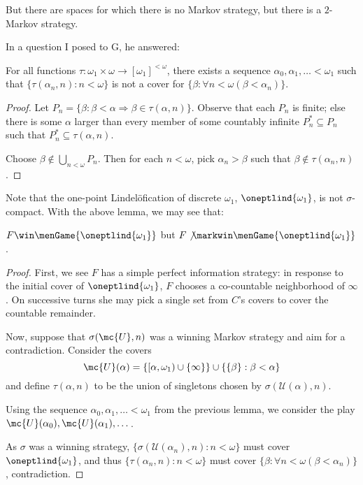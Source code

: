   But there are spaces for which there is no Markov strategy, but there is a $2$-Markov strategy.

  In a question I posed to G, he answered:

  \begin{lem}
    For all functions $\tau:\omega_1\times\omega \rightarrow [\omega_1]^{<\omega}$, there exists a sequence $\alpha_0, \alpha_1, \dots < \omega_1$ such that $\{\tau(\alpha_n,n): n<\omega\}$ is not a cover for $\{\beta:\forall n<\omega (\beta < \alpha_n)\}$.
  \end{lem}

  \begin{proof}
    Let $P_n = \{\beta: \beta < \alpha \Rightarrow \beta \in \tau(\alpha, n)\}$. Observe that each $P_n$ is finite; else there is some $\alpha$ larger than every member of some countably infinite $P_n^*\subseteq P_n$ such that $P_n^* \subseteq \tau(\alpha, n)$.

    Choose $\beta \not\in \bigcup_{n<\omega} P_n$. Then for each $n<\omega$, pick $\alpha_n>\beta$ such that $\beta \not\in \tau(\alpha_n, n)$.
  \end{proof}

  Note that the one-point Lindel\"ofication of discrete $\omega_1$, $\oneptlind{\omega_1}$, is not $\sigma$-compact. With the above lemma, we may see that:

  \begin{ex}
    $F \win \menGame{\oneptlind{\omega_1}}$ but $F \not\markwin \menGame{\oneptlind{\omega_1}}$.
  \end{ex}

  \begin{proof}
    First, we see $F$ has a simple perfect information strategy: in response to the initial cover of $\oneptlind{\omega_1}$, $F$ chooses a co-countable neighborhood of $\infty$. On successive turns she may pick a single set from $C$'s covers to cover the countable remainder.

    Now, suppose that $\sigma(\mc{U}, n)$ was a winning Markov strategy and aim for a contradiction. Consider the covers \[\mc{U}(\alpha) = \{[\alpha,\omega_1)\cup\{\infty\}\} \cup \{\{\beta\}:\beta < \alpha\}\] and define $\tau(\alpha,n)$ to be the union of singletons chosen by $\sigma(\mathcal{U}(\alpha),n)$.

    Using the sequence $\alpha_0, \alpha_1,\dots<\omega_1$ from the previous lemma, we consider the play $\mc{U}(\alpha_0),\mc{U}(\alpha_1),\dots$.

    As $\sigma$ was a winning strategy, $\{\sigma(\mathcal{U}(\alpha_n),n): n<\omega\}$ must cover $\oneptlind{\omega_1}$, and thus $\{\tau(\alpha_n,n): n<\omega\}$ must cover $\{\beta:\forall n<\omega (\beta < \alpha_n)\}$, contradiction.
  \end{proof}


